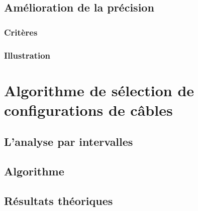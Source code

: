 \subsection{Am\'elioration de la pr\'ecision}


\subsubsection{Crit\`eres}

\subsubsection{Illustration}

\section{Algorithme de s\'election de configurations de c\^ables}


\subsection{L'analyse par intervalles}

\subsection{Algorithme}

\subsection{R\'esultats th\'eoriques}
